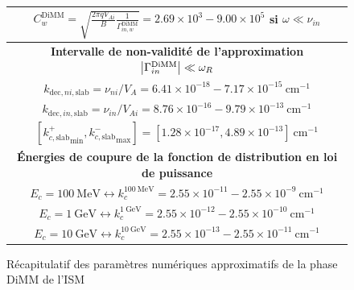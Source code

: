 \documentclass[10pt,a4paper]{article}
\begin{document}
\begin{figure}[h]
\begin{tabular}{|c|}
$C^\mathrm{DiMM}_w = \sqrt{\frac{2\pi qV_{Ai}}{B} \frac{1}{\Gamma^\mathrm{DiMM}_{in,w}}} = 2.69\times 10^3 - 9.00 \times 10^5$ si $\omega \ll \nu_{in}$ \\ 
\hline 
\hline
\bf{Intervalle de non-validité de l'approximation $\abs{\Gamma^\mathrm{DiMM}_{in}} \ll \omega_R$} \\ 
\hline
$k_{\mathrm{dec},ni,\mathrm{slab}} = \nu_{ni}/V_A = 6.41\times 10^{-18} - 7.17 \times 10^{-15} ~ \mathrm{cm}^{-1}$ \\ 
$k_{\mathrm{dec},in,\mathrm{slab}} = \nu_{in}/V_{Ai} = 8.76\times 10^{-16} - 9.79 \times 10^{-13} ~ \mathrm{cm}^{-1}$ \\ 
$\left[{k^+_{c,\mathrm{slab}}}_\mathrm{min}, {k^-_{c,\mathrm{slab}}}_\mathrm{max} \right] = [1.28 \times 10^{-17}, 4.89\times 10^{-13}] ~ \mathrm{cm}^{-1}$ \\ 
\hline
\hline
\bf{Énergies de coupure de la fonction de distribution en loi de puissance} \\ 
\hline
$E_c = 100~\mathrm{MeV} \leftrightarrow k^{100~\mathrm{MeV}}_c = 2.55\times 10^{-11} - 2.55 \times 10^{-9}~\mathrm{cm}^{-1}$ \\ 
$E_c = 1~\mathrm{GeV} \leftrightarrow k^{1~\mathrm{GeV}}_c = 2.55\times 10^{-12} - 2.55 \times 10^{-10} ~\mathrm{cm}^{-1}$     \\ 
$E_c = 10~\mathrm{GeV} \leftrightarrow k^{10~\mathrm{GeV}}_c = 2.55\times 10^{-13} - 2.55 \times 10^{-11}~\mathrm{cm}^{-1}$   \\ 
\hline

\end{tabular}
\caption{Récapitulatif des paramètres numériques approximatifs de la phase DiMM de l'ISM} 
\end{figure}
\end{document}
